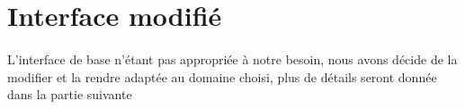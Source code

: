 \section{Interface modifié}
\paragraph{}
L'interface de base n'étant pas appropriée à notre besoin, nous avons décide de la modifier et la rendre adaptée au domaine choisi, plus de détails seront donnée dans la partie suivante